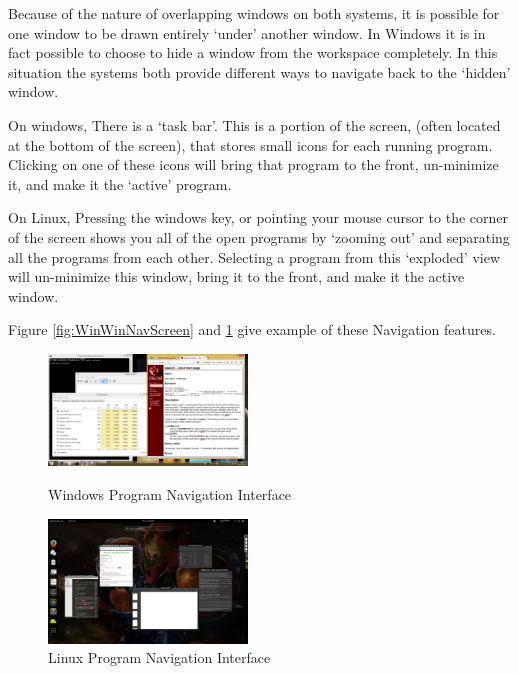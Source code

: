 \documentclass[a4paper]{report}
\begin{document}
Because of the nature of overlapping windows on both systems, it is possible for one window to be drawn entirely `under' another window. In Windows it is in fact possible to choose to hide a window from the workspace completely. In this situation the systems both provide different ways to navigate back to the `hidden' window.

On windows, There is a `task bar'. This is a portion of the screen, (often located at the bottom of the screen), that stores small icons for each running program. Clicking on one of these icons will bring that program to the front, un-minimize it, and make it the `active' program.

On Linux, Pressing the windows key, or pointing your mouse cursor to the corner of the screen shows you all of the open programs by `zooming out' and separating all the programs from each other. Selecting a program from this `exploded' view will un-minimize this window, bring it to the front, and make it the active window.

Figure \ref{fig:WinWinNavScreen} and \ref{fig:LinWinNavScreen} give example of these Navigation features.

\begin{figure}[ht]
\centering
\begin{minipage}{.5\textwidth}
  \centering
  \includegraphics[width=200px]{images/Windows_Window_Navigation_Screenshot}
  \caption{Windows Program Navigation Interface}
  \label{fig:WinWinNavScreen}
\end{minipage}%
\begin{minipage}{.5\textwidth}
  \centering
  \includegraphics[width=200px]{images/Linux_Window_Navigation_Screenshot}
  \caption{Linux Program Navigation Interface}
  \label{fig:LinWinNavScreen}
\end{minipage}
\end{figure}
\end{document}
